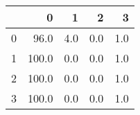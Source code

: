 \begin{tabular}{lrrrr}
\toprule
{} &      0 &    1 &    2 &    3 \\
\midrule
0 &   96.0 &  4.0 &  0.0 &  1.0 \\
1 &  100.0 &  0.0 &  0.0 &  1.0 \\
2 &  100.0 &  0.0 &  0.0 &  1.0 \\
3 &  100.0 &  0.0 &  0.0 &  1.0 \\
\bottomrule
\end{tabular}
